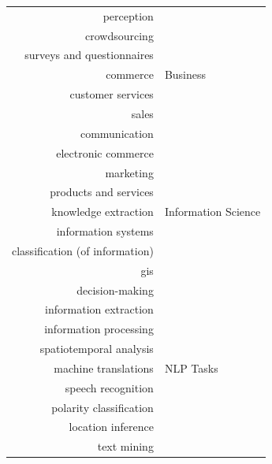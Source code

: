 \begin{center}
\begin{longtable}{rl}
        perception                      &                              \\
        crowdsourcing                   &                              \\
        surveys and questionnaires      &                              \\
        commerce                        & Business                     \\
        customer services               &                              \\
        sales                           &                              \\
        communication                   &                              \\
        electronic commerce             &                              \\
        marketing                       &                              \\
        products and services           &                              \\
        knowledge extraction            & Information Science          \\
        information systems             &                              \\
        classification (of information) &                              \\
        gis                             &                              \\
        decision-making                 &                              \\
        information extraction          &                              \\
        information processing          &                              \\
        spatiotemporal analysis         &                              \\
        machine translations            & NLP Tasks                    \\
        speech recognition              &                              \\
        polarity classification         &                              \\
        location inference              &                              \\
        text mining                     &                              \\

\end{longtable}
\end{center}
